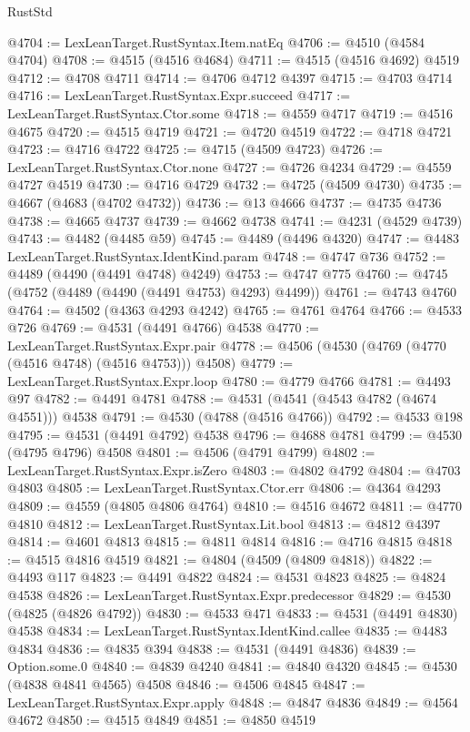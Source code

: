 \begin{lexlean}{RustStd}
\begin{coremodule}
{\begin{coremodule}
{{{{{{{{{{{{{{{{{{{{{{{{{{{{{{{{{{{{{{{{{{{{{{{{{{{{{{{@4704 := LexLeanTarget.RustSyntax.Item.natEq
@4706 := @4510 (@4584 @4704)
@4708 := @4515 (@4516 @4684)
@4711 := @4515 (@4516 @4692) @4519
@4712 := @4708 @4711
@4714 := @4706 @4712 @4397
@4715 := @4703 @4714
@4716 := LexLeanTarget.RustSyntax.Expr.succeed
@4717 := LexLeanTarget.RustSyntax.Ctor.some
@4718 := @4559 @4717
@4719 := @4516 @4675
@4720 := @4515 @4719
@4721 := @4720 @4519
@4722 := @4718 @4721
@4723 := @4716 @4722
@4725 := @4715 (@4509 @4723)
@4726 := LexLeanTarget.RustSyntax.Ctor.none
@4727 := @4726 @4234
@4729 := @4559 @4727 @4519
@4730 := @4716 @4729
@4732 := @4725 (@4509 @4730)
@4735 := @4667 (@4683 (@4702 @4732))
@4736 := @13 @4666
@4737 := @4735 @4736
@4738 := @4665 @4737
@4739 := @4662 @4738
@4741 := @4231 (@4529 @4739)
@4743 := @4482 (@4485 @59)
@4745 := @4489 (@4496 @4320)
@4747 := @4483 LexLeanTarget.RustSyntax.IdentKind.param
@4748 := @4747 @736
@4752 := @4489 (@4490 (@4491 @4748) @4249)
@4753 := @4747 @775
@4760 := @4745 (@4752 (@4489 (@4490 (@4491 @4753) @4293) @4499))
@4761 := @4743 @4760
@4764 := @4502 (@4363 @4293 @4242)
@4765 := @4761 @4764
@4766 := @4533 @726
@4769 := @4531 (@4491 @4766) @4538
@4770 := LexLeanTarget.RustSyntax.Expr.pair
@4778 := @4506 (@4530 (@4769 (@4770 (@4516 @4748) (@4516 @4753))) @4508)
@4779 := LexLeanTarget.RustSyntax.Expr.loop
@4780 := @4779 @4766
@4781 := @4493 @97
@4782 := @4491 @4781
@4788 := @4531 (@4541 (@4543 @4782 (@4674 @4551))) @4538
@4791 := @4530 (@4788 (@4516 @4766))
@4792 := @4533 @198
@4795 := @4531 (@4491 @4792) @4538
@4796 := @4688 @4781
@4799 := @4530 (@4795 @4796) @4508
@4801 := @4506 (@4791 @4799)
@4802 := LexLeanTarget.RustSyntax.Expr.isZero
@4803 := @4802 @4792
@4804 := @4703 @4803
@4805 := LexLeanTarget.RustSyntax.Ctor.err
@4806 := @4364 @4293
@4809 := @4559 (@4805 @4806 @4764)
@4810 := @4516 @4672
@4811 := @4770 @4810
@4812 := LexLeanTarget.RustSyntax.Lit.bool
@4813 := @4812 @4397
@4814 := @4601 @4813
@4815 := @4811 @4814
@4816 := @4716 @4815
@4818 := @4515 @4816 @4519
@4821 := @4804 (@4509 (@4809 @4818))
@4822 := @4493 @117
@4823 := @4491 @4822
@4824 := @4531 @4823
@4825 := @4824 @4538
@4826 := LexLeanTarget.RustSyntax.Expr.predecessor
@4829 := @4530 (@4825 (@4826 @4792))
@4830 := @4533 @471
@4833 := @4531 (@4491 @4830) @4538
@4834 := LexLeanTarget.RustSyntax.IdentKind.callee
@4835 := @4483 @4834
@4836 := @4835 @394
@4838 := @4531 (@4491 @4836)
@4839 := Option.some.{0}
@4840 := @4839 @4240
@4841 := @4840 @4320
@4845 := @4530 (@4838 @4841 @4565) @4508
@4846 := @4506 @4845
@4847 := LexLeanTarget.RustSyntax.Expr.apply
@4848 := @4847 @4836
@4849 := @4564 @4672
@4850 := @4515 @4849
@4851 := @4850 @4519
}}}}}}}}}}}}}}}}}}}}}}}}}}}}}}}}}}}}}}}}}}}}}}}}}}}}}}}
\end{coremodule}}
\end{coremodule}
\end{lexlean}
